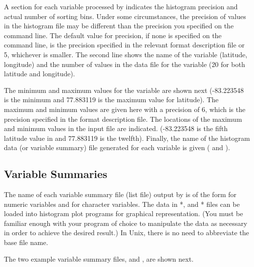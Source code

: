 A section for each variable processed by  indicates the
histogram precision and actual number of sorting bins. Under some
circumstances, the precision of values in the histogram file may be
different than the precision you specified on the command line. The
default value for precision, if none is specified on the command line,
is the precision specified in the relevant format description file or
5, whichever is smaller. The second line shows the name of the
variable (latitude, longitude) and the number of values in the data
file for the variable (20 for both latitude and longitude).

The minimum and maximum values for the variable are shown next
(-83.223548 is the minimum and 77.883119 is the maximum value for
latitude). The maximum and minimum values are given here with a
precision of 6, which is the precision specified in the format
description file. The locations of the maximum and minimum values in
the input file are indicated. (-83.223548 is the fifth latitude value
in  and 77.883119 is the twelfth). Finally, the name
of the histogram data (or variable summary) file generated for each
variable is given ( and ).

\subsection{Variable Summaries}

The name of each variable summary file (list file) output by
 is of the form  for numeric variables
and  for character variables. The data in
*, and * files can be loaded into histogram plot
programs for graphical representation. (You must be familiar enough
with your program of choice to manipulate the data as necessary in
order to achieve the desired result.) In Unix, there is no need to
abbreviate the base file name.


The two example variable summary files,  and
, are shown next.


